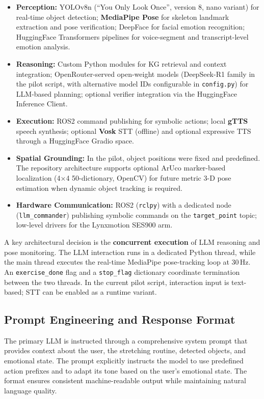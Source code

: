 \documentclass[pdflatex,sn-basic,Numbered,iicol,twocolumn]{sn-jnl}%
\begin{document}
\begin{itemize}
\item \textbf{Perception:} YOLOv8n (``You Only Look Once'', version 8, nano variant) for real-time object detection; \textbf{MediaPipe Pose} for skeleton landmark extraction and pose verification; DeepFace for facial emotion recognition; HuggingFace Transformers pipelines for voice-segment and transcript-level emotion analysis.
\item \textbf{Reasoning:} Custom Python modules for KG retrieval and context integration; OpenRouter-served open-weight models (DeepSeek-R1 family in the pilot script, with alternative model IDs configurable in \texttt{config.py}) for LLM-based planning; optional verifier integration via the HuggingFace Inference Client.
\item \textbf{Execution:} ROS2 command publishing for symbolic actions; local \textbf{gTTS} speech synthesis; optional \textbf{Vosk} STT (offline) and optional expressive TTS through a HuggingFace Gradio space.
\item \textbf{Spatial Grounding:} In the pilot, object positions were fixed and predefined. The repository architecture supports optional ArUco marker-based localization (4×4 50-dictionary, OpenCV) for future metric 3-D pose estimation when dynamic object tracking is required.
\item \textbf{Hardware Communication:} ROS2 (\texttt{rclpy}) with a dedicated node (\texttt{llm\_commander}) publishing symbolic commands on the \texttt{target\_point} topic; low-level drivers for the Lynxmotion SES900 arm.
\end{itemize}

A key architectural decision is the \textbf{concurrent execution} of LLM reasoning and pose monitoring. The LLM interaction runs in a dedicated Python thread, while the main thread executes the real-time MediaPipe pose-tracking loop at 30\,Hz. An \texttt{exercise\_done} flag and a \texttt{stop\_flag} dictionary coordinate termination between the two threads. In the current pilot script, interaction input is text-based; STT can be enabled as a runtime variant.

\subsection{Prompt Engineering and Response Format}

The primary LLM is instructed through a comprehensive system prompt that provides context about the user, the stretching routine, detected objects, and emotional state. The prompt explicitly instructs the model to use predefined action prefixes and to adapt its tone based on the user's emotional state. The format ensures consistent machine-readable output while maintaining natural language quality.
\end{document}
